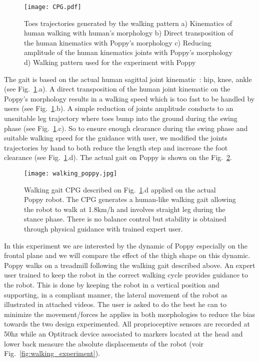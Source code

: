 \begin{figure}[h]
    \centering
    \texttt{[image: CPG.pdf]}
    \caption{Toes trajectories generated by the walking pattern a) Kinematics of human walking
    with human's morphology b) Direct transposition of the human kinematics with Poppy's morphology
    c) Reducing amplitude of the human kinematics joints with Poppy's morphology d) Walking pattern
    used for the experiment with Poppy}
    \label{fig:CPG}
\end{figure}

The gait is based on the actual human sagittal joint kinematic~\cite{Nester2003}: hip, knee, ankle (see Fig.~\ref{fig:CPG}.a). A direct transposition of the human joint kinematic on the Poppy's morphology results in a walking speed which is too fast to be handled by users (see Fig.~\ref{fig:CPG}.b). A simple reduction of joints amplitude conducts to an unsuitable leg trajectory where toes bump into the ground during the swing phase (see Fig.~\ref{fig:CPG}.c). So to ensure enough clearance during the swing phase and suitable walking speed for the guidance with user, we modified the joints trajectories by hand to both reduce the length step and increase the foot clearance (see Fig.~\ref{fig:CPG}.d). The actual gait on Poppy is shown on the Fig.~\ref{fig:humanoids2013_cpg_on_poppy}.

\begin{figure}[h]
    \centering
    \texttt{[image: walking\_poppy.jpg]}
    \caption{Walking gait CPG described on Fig.~\ref{fig:CPG}.d applied on the actual Poppy robot.
    The CPG generates a human-like walking gait allowing the robot to walk at 1.8km/h and involves straight leg during the stance phase.
    There is no balance control but stability is obtained through physical guidance with trained expert user.}
    \label{fig:humanoids2013_cpg_on_poppy}
\end{figure}

In this experiment we are interested by the dynamic of Poppy especially on the frontal plane and we will compare the effect of the thigh shape on this dynamic. Poppy walks on a treadmill following the walking gait described above. An expert user trained to keep the robot in the correct walking cycle provides guidance to the robot. This is done by keeping the robot in a vertical position and supporting, in a compliant manner, the lateral movement of the robot as illustrated in attached videos. The user is asked to do the best he can to minimize the movement/forces he applies in both morphologies to reduce the bias towards the two design experimented. All proprioceptive sensors are recorded at 50hz while an Optitrack device associated to markers located at the head and lower back measure the absolute displacements of the robot (voir Fig.~\ref{fig:walking_experiment}).

